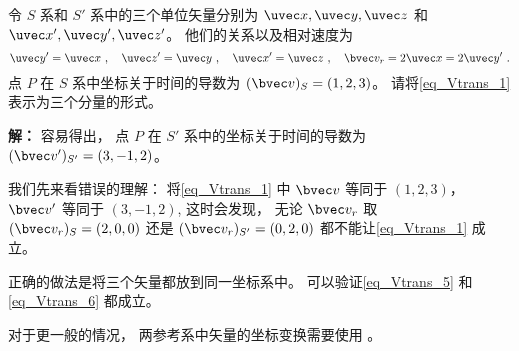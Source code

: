 \begin{example}{}\label{ex_Vtrans_2}
令 $S$ 系和 $S'$ 系中的三个单位矢量分别为 $\uvec x, \uvec y, \uvec z$ 和 $\uvec x', \uvec y', \uvec z'$。 他们的关系以及相对速度为
\begin{equation}
\uvec y' = \uvec x~, \quad
\uvec z' = \uvec y~, \quad
\uvec x' = \uvec z~, \quad
\bvec v_r = 2\uvec x = 2\uvec y'~.
\end{equation}
点 $P$ 在 $S$ 系中坐标关于时间的导数为 $(\bvec v)_S = (1, 2, 3)$。 请将\autoref{eq_Vtrans_1} 表示为三个分量的形式。

\textbf{解：} 容易得出， 点 $P$ 在 $S'$ 系中的坐标关于时间的导数为 $(\bvec v')_{S'} = (3, -1, 2)$。

我们先来看错误的理解： 将\autoref{eq_Vtrans_1} 中 $\bvec v$ 等同于 $(1, 2, 3)$， $\bvec v'$ 等同于 $(3, -1, 2)$,  这时会发现， 无论 $\bvec v_r$ 取 $(\bvec v_r)_S = (2, 0, 0)$ 还是 $(\bvec v_r)_{S'} = (0, 2, 0)$ 都不能让\autoref{eq_Vtrans_1} 成立。

正确的做法是将三个矢量都放到同一坐标系中。 可以验证\autoref{eq_Vtrans_5} 和\autoref{eq_Vtrans_6} 都成立。

对于更一般的情况， 两参考系中矢量的坐标变换需要使用 。
\end{example}
